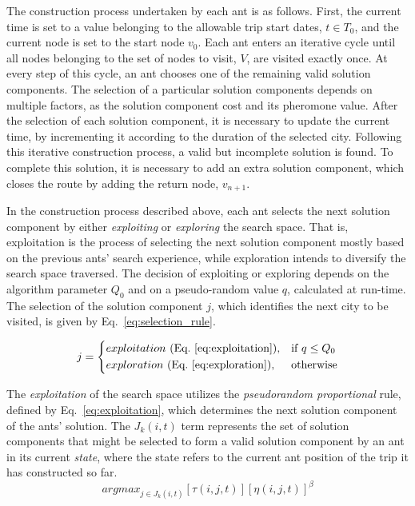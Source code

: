 The construction process undertaken by each ant is as follows. First, the current time is set to a value belonging to the allowable trip start dates, $t \in T_0$, and the current node is set to the start node $v_0$. Each ant enters an iterative cycle until all nodes belonging to the set of nodes to visit, $V$, are visited exactly once. At every step of this cycle, an ant chooses one of the remaining valid solution components. The selection of a particular solution components depends on multiple factors, as the solution component cost and its pheromone value. After the selection of each solution component, it is necessary to update the current time, by incrementing it  according to the duration of the selected city. Following this iterative construction process, a valid but incomplete solution is found. To complete this solution, it is necessary to add an extra solution component, which closes the route by adding the return node, $v_{n+1}$.

In the construction process described above, each ant selects the next solution component by either \textit{exploiting} or \textit{exploring} the search space. That is, exploitation is the process of selecting the next solution component mostly based on the previous ants' search experience, while exploration intends to diversify the search space traversed. The decision of exploiting or exploring depends on the algorithm parameter $Q_0$ and on a pseudo-random value $q$, calculated at run-time. The selection of the solution component $j$, which identifies the next city to be visited, is given by Eq.~\ref{eq:selection_rule}. 

\begin{equation}
  \label{eq:selection_rule}
  j =  \left \{
    \begin{aligned}
      & exploitation \ (\text{Eq.} \ \ref{eq:exploitation}) , && \text{if}\ q \leq Q_0 \\
      & exploration \ (\text{Eq.} \ \ref{eq:exploration}), && \text{otherwise}
    \end{aligned} \right. 
\end{equation}

The \textit{exploitation} of the search space utilizes the \textit{pseudorandom proportional} rule, defined by Eq.~\ref{eq:exploitation}, which determines the next solution component of the ants' solution. The $J_k(i,t)$ term represents the set of solution components that might be selected to form a valid solution component by an ant in its current \textit{state}, where the state refers to the current ant position of the trip it has constructed so far.
\begin{equation}
  \label{eq:exploitation}
    arg max_{j \in J_k(i,t)} {[\tau(i,j,t)][\eta(i,j,t)]^\beta}
\end{equation}

